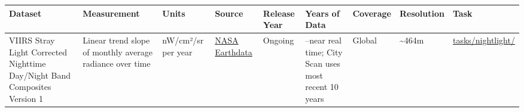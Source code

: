 \documentclass[
  letterpaper,
  DIV=11,
  numbers=noendperiod]{scrreprt}
\newcounter{none} %
\begin{document}
{\def\LTcaptype{none} %
\begin{longtable}[]{@{}
  >{\raggedright\arraybackslash}p{}
  >{\raggedright\arraybackslash}p{}
  >{\raggedright\arraybackslash}p{}
  >{\raggedright\arraybackslash}p{}
  >{\raggedright\arraybackslash}p{}
  >{\raggedright\arraybackslash}p{}
  >{\raggedright\arraybackslash}p{}
  >{\raggedright\arraybackslash}p{}
  >{\raggedright\arraybackslash}p{}@{}}
\toprule\noalign{}
\begin{minipage}[b]{\linewidth}\raggedright
Dataset
\end{minipage} & \begin{minipage}[b]{\linewidth}\raggedright
Measurement
\end{minipage} & \begin{minipage}[b]{\linewidth}\raggedright
Units
\end{minipage} & \begin{minipage}[b]{\linewidth}\raggedright
Source
\end{minipage} & \begin{minipage}[b]{\linewidth}\raggedright
Release Year
\end{minipage} & \begin{minipage}[b]{\linewidth}\raggedright
Years of Data
\end{minipage} & \begin{minipage}[b]{\linewidth}\raggedright
Coverage
\end{minipage} & \begin{minipage}[b]{\linewidth}\raggedright
Resolution
\end{minipage} & \begin{minipage}[b]{\linewidth}\raggedright
Task
\end{minipage} \\
\midrule\noalign{}
\endhead
\bottomrule\noalign{}
\endlastfoot
VIIRS Stray Light Corrected Nighttime Day/Night Band Composites Version
1 & Linear trend slope of monthly average radiance over time & nW/cm²/sr
per year &
\href{https://earthdata.nasa.gov/earth-observation-data/near-real-time/download-nrt-data/viirs-nrt}{NASA
Earthdata} & Ongoing & 2013--near real time; City Scan uses most recent
10 years & Global & \textasciitilde464m &
\href{../tasks/nightlight/}{tasks/nightlight/} \\
\end{longtable}
}
\end{document}
